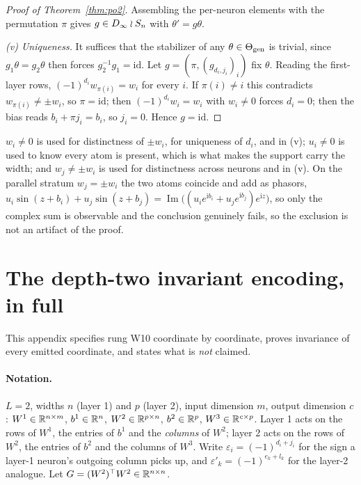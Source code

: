 \begin{proof}[Proof of Theorem~\ref{thm:po2}]
Assembling the per-neuron elements with the permutation $\pi$ gives $g \in D_\infty \wr S_n$ with
$\theta' = g\theta$.

\emph{(v) Uniqueness.} It suffices that the stabilizer of any $\theta \in \Theta_{\mathrm{gen}}$ is trivial, since
$g_1\theta = g_2\theta$ then forces $g_2^{-1}g_1 = \mathrm{id}$. Let $g = (\pi, (g_{d_i,j_i})_i)$
fix $\theta$. Reading the first-layer rows, $(-1)^{d_i} w_{\pi(i)} = w_i$ for every $i$. If
$\pi(i) \neq i$ this contradicts $w_{\pi(i)} \neq \pm w_i$, so $\pi = \mathrm{id}$; then
$(-1)^{d_i}w_i = w_i$ with $w_i \neq 0$ forces $d_i = 0$; then the bias reads
$b_i + \pi j_i = b_i$, so $j_i = 0$. Hence $g = \mathrm{id}$.
\end{proof}

\begin{remark}
$w_i \neq 0$ is used for distinctness of $\pm w_i$, for uniqueness of $d_i$, and in (v);
$u_i \neq 0$ is used to know every atom is present, which is what makes the support carry the
width; and $w_j \neq \pm w_i$ is used for distinctness across neurons and in (v). On the parallel
stratum $w_j = \pm w_i$ the two atoms coincide and add as phasors,
$u_i\sin(z+b_i) + u_j\sin(z+b_j) = \operatorname{Im}\big((u_ie^{\mathrm i b_i}
+ u_je^{\mathrm i b_j})e^{\mathrm i z}\big)$, so only the complex sum is observable and the conclusion genuinely fails, so the exclusion is not an artifact of the proof.
\end{remark}

\section{The depth-two invariant encoding, in full}\label{app:w10}

This appendix specifies rung W10 coordinate by coordinate, proves invariance of every emitted
coordinate, and states what is \emph{not} claimed.

\paragraph{Notation.} $L=2$, widths $n$ (layer 1) and $p$ (layer 2), input dimension $m$, output
dimension $c$: $W^1 \in \mathbb{R}^{n\times m}$, $b^1 \in \mathbb{R}^n$, $W^2 \in \mathbb{R}^{p\times n}$, $b^2 \in \mathbb{R}^p$,
$W^3 \in \mathbb{R}^{c\times p}$. Layer 1 acts on the rows of $W^1$, the entries of $b^1$ and the
\emph{columns} of $W^2$; layer 2 acts on the rows of $W^2$, the entries of $b^2$ and the columns of
$W^3$. Write $\varepsilon_i = (-1)^{d_i + j_i}$ for the sign a layer-1 neuron's outgoing column
picks up, and $\varepsilon'_k = (-1)^{e_k + l_k}$ for the layer-2 analogue. Let
$G = (W^2)^\top W^2 \in \mathbb{R}^{n \times n}$.

